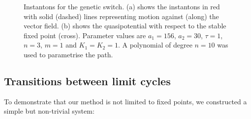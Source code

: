 \begin{figure}
\begin{subfigure}[b]{0.4\textwidth}
        \caption[Extending Cosserat rod]%
        {}    
        \label{fig:extending cosserat rod}
    \end{subfigure}    
    \caption[ ]
    {\small Instantons for the genetic switch. (a) shows the instantons
in red with solid (dashed) lines representing motion against (along)
the vector field. (b) shows the quasipotential with respect
to the stable fixed point (cross). Parameter values are $a_{1}=156$, $a_{2}=30$,
$\tau=1$, $n=3$, $m=1$ and $K_{1}=K_{2}=1$. A polynomial of degree $n=10$ was used to parametrise the path.} 
    \label{fig:genetic-switch-quasipotential}
\end{figure} 



\subsection{Transitions between limit cycles}

To demonstrate that our method is not limited to fixed points, we
constructed a simple but non-trivial system:

